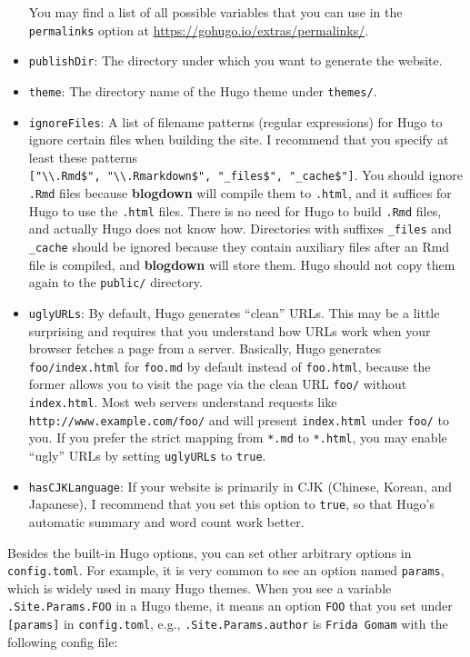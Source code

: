 \documentclass[12pt,]{krantz}
\theoremstyle{definition}
\theoremstyle{definition}
\theoremstyle{definition}
\theoremstyle{remark}
\begin{document}
\begin{itemize}
  You may find a list of all possible variables that you can use in the
  \texttt{permalinks} option at
  \url{https://gohugo.io/extras/permalinks/}.
\item
  \texttt{publishDir}: The directory under which you want to generate
  the website.
\item
  \texttt{theme}: The directory name of the Hugo theme under
  \texttt{themes/}.
\item
  \texttt{ignoreFiles}: A list of filename patterns (regular
  expressions) for Hugo to ignore certain files when
  building the site. I recommend that you specify at least these
  patterns
  \texttt{{[}"\textbackslash{}\textbackslash{}.Rmd\$",\ "\textbackslash{}\textbackslash{}.Rmarkdown\$",\ "\_files\$",\ "\_cache\$"{]}}.
  You should ignore \texttt{.Rmd} files because \textbf{blogdown} will
  compile them to \texttt{.html}, and it suffices for Hugo to use the
  \texttt{.html} files. There is no need for Hugo to build \texttt{.Rmd}
  files, and actually Hugo does not know how. Directories with suffixes
  \texttt{\_files} and \texttt{\_cache} should be ignored because they
  contain auxiliary files after an Rmd file is compiled, and
  \textbf{blogdown} will store them. Hugo should not copy them again to
  the \texttt{public/} directory.
\item
  \texttt{uglyURLs}: By default, Hugo generates ``clean''
  URLs. This may be a little surprising and requires
  that you understand how URLs work when your browser fetches a page
  from a server. Basically, Hugo generates \texttt{foo/index.html} for
  \texttt{foo.md} by default instead of \texttt{foo.html}, because the
  former allows you to visit the page via the clean URL \texttt{foo/}
  without \texttt{index.html}. Most web servers understand requests like
  \texttt{http://www.example.com/foo/} and will present
  \texttt{index.html} under \texttt{foo/} to you. If you prefer the
  strict mapping from \texttt{*.md} to \texttt{*.html}, you may enable
  ``ugly'' URLs by setting \texttt{uglyURLs} to \texttt{true}.
\item
  \texttt{hasCJKLanguage}: If your website is primarily in
  CJK (Chinese, Korean, and Japanese), I recommend
  that you set this option to \texttt{true}, so that Hugo's automatic
  summary and word count work better.
\end{itemize}

Besides the built-in Hugo options, you can set other arbitrary options
in \texttt{config.toml}. For example, it is very common to see an option
named \texttt{params}, which is widely used in many Hugo themes. When
you see a variable \texttt{.Site.Params.FOO} in a Hugo theme, it means
an option \texttt{FOO} that you set under \texttt{{[}params{]}} in
\texttt{config.toml}, e.g., \texttt{.Site.Params.author} is
\texttt{Frida\ Gomam} with the following config file:
\end{document}
